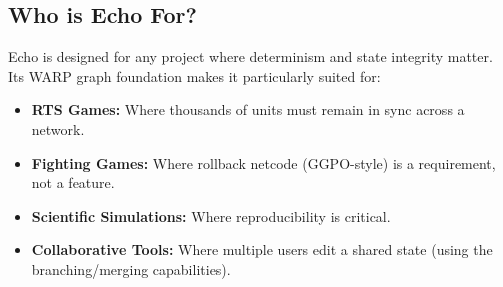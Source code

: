 \subsection{Who is Echo For?}

Echo is designed for any project where determinism and state integrity matter. Its WARP graph foundation makes it particularly suited for:
\begin{itemize}
    \item \textbf{RTS Games:} Where thousands of units must remain in sync across a network.
    \item \textbf{Fighting Games:} Where rollback netcode (GGPO-style) is a requirement, not a feature.
    \item \textbf{Scientific Simulations:} Where reproducibility is critical.
    \item \textbf{Collaborative Tools:} Where multiple users edit a shared state (using the branching/merging capabilities).
\end{itemize}
